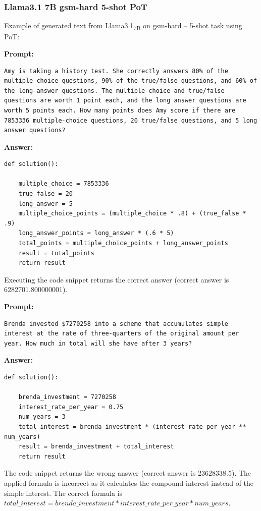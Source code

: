 	\subsubsection*{Llama3.1 7B gsm-hard 5-shot PoT}
	\noindent Example of generated text from Llama3.1\textsubscript{7B} on gsm-hard -- 5-shot task using PoT:
	\begin{displayquote}
		\textbf{Prompt:}
		\begin{Verbatim}[fontsize=\small,breaklines]
Amy is taking a history test. She correctly answers 80% of the multiple-choice questions, 90% of the true/false questions, and 60% of the long-answer questions. The multiple-choice and true/false questions are worth 1 point each, and the long answer questions are worth 5 points each. How many points does Amy score if there are 7853336 multiple-choice questions, 20 true/false questions, and 5 long answer questions?
	\end{Verbatim}
		\textbf{Answer:}
		\begin{Verbatim}[fontsize=\small,breaklines]
def solution():

    multiple_choice = 7853336
    true_false = 20
    long_answer = 5
    multiple_choice_points = (multiple_choice * .8) + (true_false * .9)
    long_answer_points = long_answer * (.6 * 5)
    total_points = multiple_choice_points + long_answer_points
    result = total_points
    return result
	\end{Verbatim}
	\end{displayquote}
	Executing the code snippet returns the correct answer (correct answer is 6282701.800000001).
	\begin{displayquote}
		\textbf{Prompt:}
		\begin{Verbatim}[fontsize=\small,breaklines]
Brenda invested $7270258 into a scheme that accumulates simple interest at the rate of three-quarters of the original amount per year. How much in total will she have after 3 years?
	\end{Verbatim}
		\textbf{Answer:}
		\begin{Verbatim}[fontsize=\small,breaklines]
def solution():

    brenda_investment = 7270258
    interest_rate_per_year = 0.75
    num_years = 3
    total_interest = brenda_investment * (interest_rate_per_year ** num_years)
    result = brenda_investment + total_interest
    return result
	\end{Verbatim}
	\end{displayquote}
	The code snippet returns the wrong answer (correct answer is 23628338.5).
	The applied formula is incorrect as it calculates the compound interest instead of the simple interest.
	The correct formula is $total\_interest = brenda\_investment * interest\_rate\_per\_year * num\_years$.